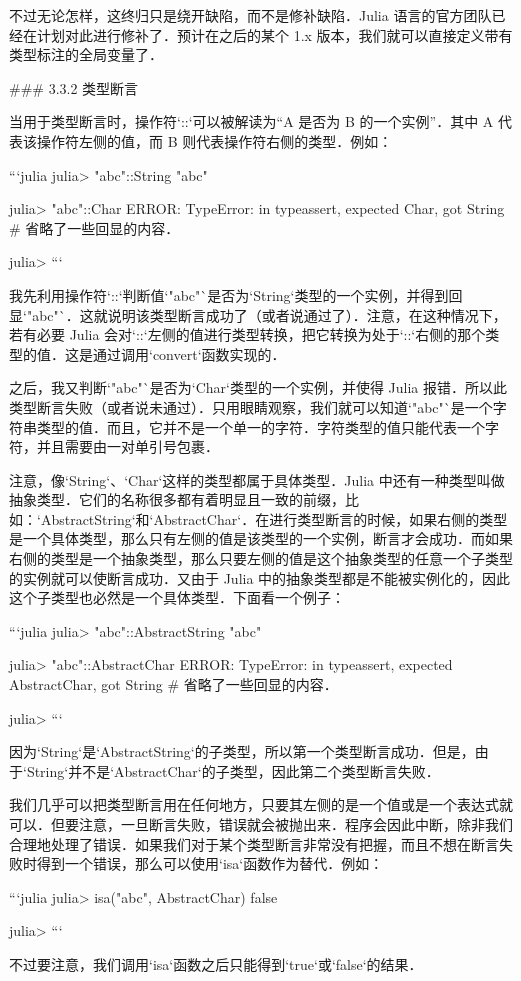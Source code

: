 不过无论怎样，这终归只是绕开缺陷，而不是修补缺陷．Julia 语言的官方团队已经在计划对此进行修补了．预计在之后的某个 1.x 版本，我们就可以直接定义带有类型标注的全局变量了．

### 3.3.2 类型断言

当用于类型断言时，操作符`::`可以被解读为“A 是否为 B 的一个实例”．其中 A 代表该操作符左侧的值，而 B 则代表操作符右侧的类型．例如：

```julia
julia> "abc"::String
"abc"

julia> "abc"::Char
ERROR: TypeError: in typeassert, expected Char, got String
# 省略了一些回显的内容．

julia> 
```

我先利用操作符`::`判断值`"abc"`是否为`String`类型的一个实例，并得到回显`"abc"`．这就说明该类型断言成功了（或者说通过了）．注意，在这种情况下，若有必要 Julia 会对`::`左侧的值进行类型转换，把它转换为处于`::`右侧的那个类型的值．这是通过调用`convert`函数实现的．

之后，我又判断`"abc"`是否为`Char`类型的一个实例，并使得 Julia 报错．所以此类型断言失败（或者说未通过）．只用眼睛观察，我们就可以知道`"abc"`是一个字符串类型的值．而且，它并不是一个单一的字符．字符类型的值只能代表一个字符，并且需要由一对单引号包裹．

注意，像`String`、`Char`这样的类型都属于具体类型．Julia 中还有一种类型叫做抽象类型．它们的名称很多都有着明显且一致的前缀，比如：`AbstractString`和`AbstractChar`．在进行类型断言的时候，如果右侧的类型是一个具体类型，那么只有左侧的值是该类型的一个实例，断言才会成功．而如果右侧的类型是一个抽象类型，那么只要左侧的值是这个抽象类型的任意一个子类型的实例就可以使断言成功．又由于 Julia 中的抽象类型都是不能被实例化的，因此这个子类型也必然是一个具体类型．下面看一个例子：

```julia
julia> "abc"::AbstractString
"abc"

julia> "abc"::AbstractChar
ERROR: TypeError: in typeassert, expected AbstractChar, got String
# 省略了一些回显的内容．

julia> 
```

因为`String`是`AbstractString`的子类型，所以第一个类型断言成功．但是，由于`String`并不是`AbstractChar`的子类型，因此第二个类型断言失败．

我们几乎可以把类型断言用在任何地方，只要其左侧的是一个值或是一个表达式就可以．但要注意，一旦断言失败，错误就会被抛出来．程序会因此中断，除非我们合理地处理了错误．如果我们对于某个类型断言非常没有把握，而且不想在断言失败时得到一个错误，那么可以使用`isa`函数作为替代．例如：

```julia
julia> isa("abc", AbstractChar)
false

julia> 
```

不过要注意，我们调用`isa`函数之后只能得到`true`或`false`的结果．